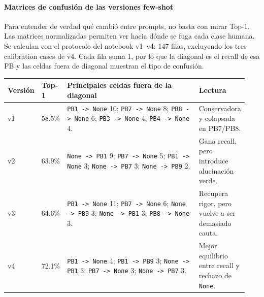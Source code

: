 \paragraph*{Matrices de confusión de las versiones few-shot}

Para entender de verdad qué cambió entre prompts, no basta con mirar Top-1. Las matrices normalizadas permiten ver hacia dónde se fuga cada clase humana. Se calculan con el protocolo del notebook v1--v4: 147 filas, excluyendo los tres calibration cases de v4. Cada fila suma 1, por lo que la diagonal es el recall de esa PB y las celdas fuera de diagonal muestran el tipo de confusión.

\begin{center}
\scriptsize
\setlength{\tabcolsep}{4pt}
\renewcommand{\arraystretch}{1.18}
\begin{tabular}{p{0.12\linewidth}p{0.10\linewidth}p{0.58\linewidth}p{0.14\linewidth}}
\toprule
Versión & Top-1 & Principales celdas fuera de la diagonal & Lectura \\
\midrule
v1 & 58.5\% & \texttt{PB1 -> None} 10; \texttt{PB7 -> None} 8; \texttt{PB8 -> None} 6; \texttt{PB3 -> None} 4; \texttt{PB4 -> None} 4. & Conservadora y colapsada en PB7/PB8. \\
v2 & 63.9\% & \texttt{None -> PB1} 9; \texttt{PB7 -> None} 5; \texttt{PB1 -> None} 3; \texttt{None -> PB7} 3; \texttt{None -> PB9} 2. & Gana recall, pero introduce alucinación verde. \\
v3 & 64.6\% & \texttt{PB1 -> None} 11; \texttt{PB7 -> None} 6; \texttt{None -> PB9} 3; \texttt{None -> PB1} 3; \texttt{PB8 -> None} 3. & Recupera rigor, pero vuelve a ser demasiado cauta. \\
v4 & 72.1\% & \texttt{PB1 -> None} 4; \texttt{PB1 -> PB9} 3; \texttt{None -> PB1} 3; \texttt{PB7 -> None} 3; \texttt{None -> PB7} 3. & Mejor equilibrio entre recall y rechazo de \texttt{None}. \\
\bottomrule
\end{tabular}
\end{center}

